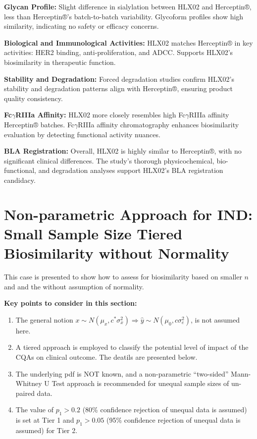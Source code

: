 \documentclass[
  12pt,
  a4paper,
]{article}
\providecommand{\tightlist}{%
  \setlength{\itemsep}{0pt}\setlength{\parskip}{0pt}}
\numberwithin{equation}{section}
\theoremstyle{plain}
\theoremstyle{definition}
\theoremstyle{remark}
\theoremstyle{note}
\begin{document}
\textbf{Glycan Profile:} Slight difference in sialylation between HLX02
and Herceptin®, less than Herceptin®'s batch-to-batch variability.
Glycoform profiles show high similarity, indicating no safety or
efficacy concerns.

\textbf{Biological and Immunological Activities:} HLX02 matches
Herceptin® in key activities: HER2 binding, anti-proliferation, and
ADCC. Supports HLX02's biosimilarity in therapeutic function.

\textbf{Stability and Degradation:} Forced degradation studies confirm
HLX02's stability and degradation patterns align with Herceptin®,
ensuring product quality consistency.

\textbf{Fc\(\gamma\)RIIIa Affinity:} HLX02 more closely resembles high
Fc\(\gamma\)RIIIa affinity Herceptin® batches. Fc\(\gamma\)RIIIa
affinity chromatography enhances biosimilarity evaluation by detecting
functional activity nuances.

\textbf{BLA Registration:} Overall, HLX02 is highly similar to
Herceptin®, with no significant clinical differences. The study's
thorough physicochemical, bio-functional, and degradation analyses
support HLX02's BLA registration candidacy.

\hypertarget{non-parametric-approach-for-ind-small-sample-size-tiered-biosimilarity-without-normality}{%
\section{Non-parametric Approach for IND: Small Sample Size Tiered
Biosimilarity without
Normality}\label{non-parametric-approach-for-ind-small-sample-size-tiered-biosimilarity-without-normality}}

This case is presented to show how to assess for biosimilarity based on
smaller \(n\) and and the without assumption of normality.

\textbf{Key points to consider in this section:}

\begin{enumerate}
\def\labelenumi{\arabic{enumi}.}
\tightlist
\item
  The general notion
  \(x \sim N\left(\mu_x, c^* \sigma_x^2\right) \Longrightarrow \hat{y} \sim N\left(\mu_0, c \sigma_e^2\right)\),
  is not assumed here.
\item
  A tiered approach is employed to classify the potential level of
  impact of the CQAs on clinical outcome. The deatils are presented
  below.
\item
  The underlying pdf is NOT known, and a non-parametric ``two-sided''
  Mann-Whitney U Test approach is recommended for unequal sample sizes
  of un-paired data.
\item
  The value of \(p_1 > 0.2\) (80\% confidence rejection of unequal data
  is assumed) is set at Tier 1 and \(p_1 > 0.05\) (95\% confidence
  rejection of unequal data is assumed) for Tier 2.
\end{enumerate}
\end{document}
